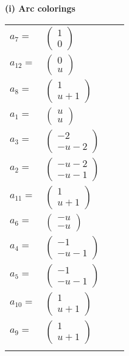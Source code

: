 \documentclass[1p]{elsarticle_modified}
\theoremstyle{definition}
\begin{document}
\flushleft \textbf{(i) Arc colorings}\\
\begin{tabular}{m{7pt} m{180pt} m{7pt} m{180pt} }
\flushright $a_{7}=$&$\begin{pmatrix}1\\0\end{pmatrix}$ \\
\flushright $a_{12}=$&$\begin{pmatrix}0\\u\end{pmatrix}$ \\
\flushright $a_{8}=$&$\begin{pmatrix}1\\u+1\end{pmatrix}$ \\
\flushright $a_{1}=$&$\begin{pmatrix}u\\u\end{pmatrix}$ \\
\flushright $a_{3}=$&$\begin{pmatrix}-2\\- u-2\end{pmatrix}$ \\
\flushright $a_{2}=$&$\begin{pmatrix}- u-2\\- u-1\end{pmatrix}$ \\
\flushright $a_{11}=$&$\begin{pmatrix}1\\u+1\end{pmatrix}$ \\
\flushright $a_{6}=$&$\begin{pmatrix}- u\\- u\end{pmatrix}$ \\
\flushright $a_{4}=$&$\begin{pmatrix}-1\\- u-1\end{pmatrix}$ \\
\flushright $a_{5}=$&$\begin{pmatrix}-1\\- u-1\end{pmatrix}$ \\
\flushright $a_{10}=$&$\begin{pmatrix}1\\u+1\end{pmatrix}$ \\
\flushright $a_{9}=$&$\begin{pmatrix}1\\u+1\end{pmatrix}$\\&\end{tabular}
\end{document}
